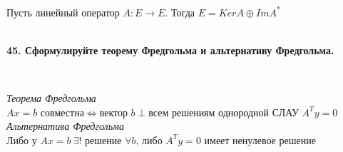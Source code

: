 \documentclass{article}
\begin{document}
	{
		$\;$
		\setlength{\parindent}{0.4cm}
		\hangindent=0.4cm
		
		Пусть линейный оператор $A:E\rightarrow E$. Тогда $E=KerA\oplus ImA^*$\\
		
		$\;$
		\setlength{\parindent}{0cm}
		\hangindent=0cm
	}

	\textbf{45. Сформулируйте теорему Фредгольма и альтернативу Фредгольма.}
	
	{
		$\;$
		\setlength{\parindent}{0.4cm}
		\hangindent=0.4cm
		
		\textit{Теорема Фредгольма}\\
       $Ax=b$ совместна$\Leftrightarrow$вектор $b\perp$всем решениям однородной СЛАУ $A^Ty=0$\\
       \textit{Альтернатива Фредгольма}\\
       Либо у $Ax=b\ \exists!$ решение $\forall b$, либо $A^Ty=0$ имеет ненулевое решение\\
		
		$\;$
		\setlength{\parindent}{0cm}
		\hangindent=0cm
	}


	
\end{document}
